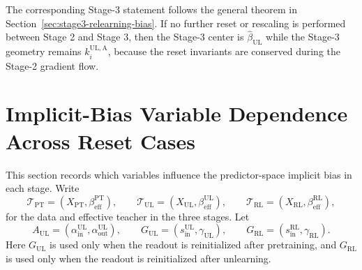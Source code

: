 \documentclass[11pt]{article}
\begin{document}
The corresponding Stage-3 statement follows the general theorem in
Section~\ref{sec:stage3-relearning-bias}.  If no further reset or rescaling is
performed between Stage 2 and Stage 3, then the Stage-3 center is
\(\widehat\beta_{\mathrm{UL}}\) while the Stage-3 geometry remains
\(k_i^{\mathrm{UL,A}}\), because the reset invariants are conserved during the
Stage-2 gradient flow.

\section{Implicit-Bias Variable Dependence Across Reset Cases}
\label{sec:reset-variable-dependence}

This section records which variables influence the predictor-space implicit
bias in each stage.  Write
\begin{equation}
    \mathcal T_{\mathrm{PT}}
    =
    (X_{\mathrm{PT}},\beta_{\mathrm{eff}}^{\mathrm{PT}}),
    \qquad
    \mathcal T_{\mathrm{UL}}
    =
    (X_{\mathrm{UL}},\beta_{\mathrm{eff}}^{\mathrm{UL}}),
    \qquad
    \mathcal T_{\mathrm{RL}}
    =
    (X_{\mathrm{RL}},\beta_{\mathrm{eff}}^{\mathrm{RL}}),
\end{equation}
for the data and effective teacher in the three stages.  Let
\[
    A_{\mathrm{UL}}
    =
    (\alpha_{\mathrm{in}}^{\mathrm{UL}},
     \alpha_{\mathrm{out}}^{\mathrm{UL}}),
    \qquad
    G_{\mathrm{UL}}
    =
    (s_{\mathrm{in}}^{\mathrm{UL}},\gamma_{\mathrm{UL}}),
    \qquad
    G_{\mathrm{RL}}
    =
    (s_{\mathrm{in}}^{\mathrm{RL}},\gamma_{\mathrm{RL}}).
\]
Here \(G_{\mathrm{UL}}\) is used only when the readout is reinitialized after
pretraining, and \(G_{\mathrm{RL}}\) is used only when the readout is
reinitialized after unlearning.
\end{document}
